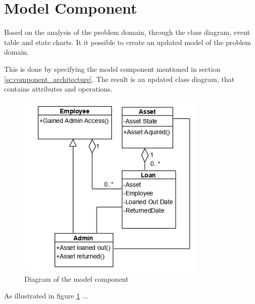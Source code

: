 \section{Model Component} \label{sc:model_component}
Based on the analysis of the problem domain, through the class diagram, event table and state charts. It it possible to create an updated model of the problem domain. 
\par
This is done by specifying the model component mentioned in section \ref{sc:component_architecture}. The result is an updated class diagram, that contains attributes and operations. 

\begin{figure}[H]
    \centering
    \includegraphics[width=0.8\textwidth]{figures/Model_ComponentV2.PNG}
    \caption{Diagram of the model component}
    \label{fig:ModelComponent}
\end{figure}

As illustrated in figure \ref{fig:ModelComponent} ...